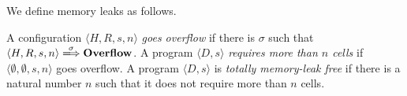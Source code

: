 %

We define memory leaks as follows.

\begin{myDef}
\label{df:ml}
A configuration \(\langle H, R, s, n \rangle\) \emph{goes overflow} if
there is \(\sigma\) such that \(\langle H, R, s, n \rangle
\xLongrightarrow{\sigma} \OVERFLOW\).  A program \(\langle D, s
\rangle\) \emph{requires more than \(n\) cells} if \(\langle
\emptyset, \emptyset, s, n \rangle\) goes overflow.  A program
\(\langle D, s \rangle\) is \emph{totally memory-leak free} if there
is a natural number \(n\) such that it does not require more than
\(n\) cells.
\end{myDef}

